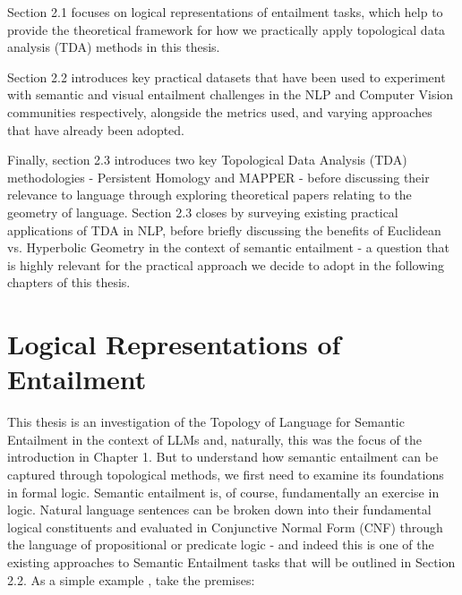 \documentclass[12pt,twoside]{report}
\begin{document}
Section 2.1 focuses on logical representations of entailment tasks, which help to provide the theoretical framework for how we practically apply topological data analysis (TDA) methods in this thesis. \par \quad Section 2.2 introduces key practical datasets that have been used to experiment with semantic and visual entailment challenges in the NLP and Computer Vision communities respectively, alongside the metrics used, and varying approaches that have already been adopted.  \par \quad Finally, section 2.3 introduces two key Topological Data Analysis (TDA) methodologies - Persistent Homology and MAPPER - before discussing their relevance to language through exploring theoretical papers relating to the geometry of language. Section 2.3 closes by surveying existing practical applications of TDA in NLP, before briefly discussing the benefits of Euclidean vs. Hyperbolic Geometry in the context of semantic entailment - a question that is highly relevant for the practical approach we decide to adopt in the following chapters of this thesis. 

\section{Logical Representations of Entailment}

This thesis is an investigation of the Topology of Language for Semantic Entailment in the context of LLMs and, naturally, this was the focus of the introduction in Chapter 1. But to understand how semantic entailment can be captured through topological methods, we first need to examine its foundations in formal logic. Semantic entailment is, of course, fundamentally an exercise in logic. Natural language sentences can be broken down into their fundamental logical constituents and evaluated in Conjunctive Normal Form (CNF) through the language of propositional or predicate logic - and indeed this is one of the existing approaches to Semantic Entailment tasks that will be outlined in Section 2.2. As a simple example \cite{fSadri}, take the premises: 
\begin{flushleft}
 \\
 \\

\end{flushleft}
\end{document}
